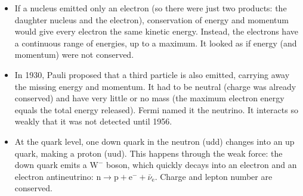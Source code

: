 \documentclass[12pt]{article}
\begin{document}
\ansq
\begin{crit}
\end{crit}
\sample
\begin{itemize}
  \item If a nucleus emitted only an electron (so there were just two products: the daughter nucleus and
        the electron), conservation of energy and momentum would give every electron the same kinetic
        energy. Instead, the electrons have a
        continuous range of energies, up to a maximum. It looked as if energy (and momentum) were not
        conserved.
  \item In 1930, Pauli proposed that a third particle is also emitted, carrying away the missing energy
        and momentum. It had to be neutral (charge was already conserved) and have very little or no mass
        (the maximum electron energy equals the total energy released). Fermi named it the neutrino. It
        interacts so weakly that it was not detected until 1956.
  \item At the quark level, one down quark in the neutron (udd) changes into an up quark, making a proton
        (uud). This happens through the weak force: the down quark emits a $\mathrm{W}^-$ boson, which
        quickly decays into an electron and an electron antineutrino:
        $\mathrm{n} \rightarrow \mathrm{p} + \mathrm{e}^- + \bar{\nu}_\mathrm{e}$. Charge and lepton number
        are conserved.
\end{itemize}
\end{document}

